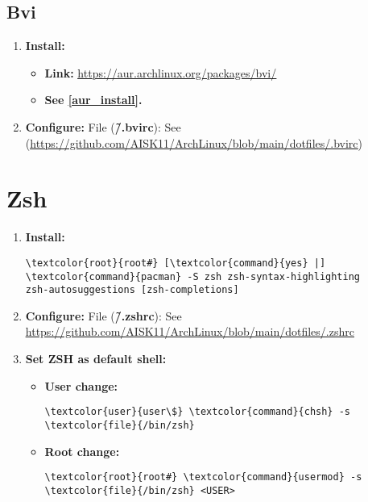 \documentclass[10pt, a4paper, onecolumn, openany]{book} %
\begin{document}
\subsection{Bvi}
\begin{enumerate}
    \item \textbf{Install:}
    \begin{itemize}
        \item \textbf{Link:} \underline{\href{https://aur.archlinux.org/packages/bvi/}{https://aur.archlinux.org/packages/bvi/}}
        \item \textbf{See \underline{\ref{aur_install}}.}
    \end{itemize}
    \item \textbf{Configure:}
\newline File (\textbf{\textcolor{file}{\~/.bvirc}}):
\newline See (\underline{\href{https://github.com/AISK11/ArchLinux/blob/main/dotfiles/.bvirc}{https://github.com/AISK11/ArchLinux/blob/main/dotfiles/.bvirc}})
\end{enumerate}
\section{Zsh}
\begin{enumerate}
    \item \textbf{Install:}
\begin{Verbatim}[commandchars=\\\{\}]
\textcolor{root}{root#} [\textcolor{command}{yes} |] \textcolor{command}{pacman} -S zsh zsh-syntax-highlighting
zsh-autosuggestions [zsh-completions]
\end{Verbatim}    
    \item \textbf{Configure:}
\newline File (\textbf{\textcolor{file}{\~/.zshrc}}):
\newline See \underline{\href{https://github.com/AISK11/ArchLinux/blob/main/dotfiles/.zshrc}{https://github.com/AISK11/ArchLinux/blob/main/dotfiles/.zshrc}}
    \item \textbf{Set ZSH as default shell:}
    \begin{itemize}
        \item \textbf{User change:}
\begin{Verbatim}[commandchars=\\\{\}]
\textcolor{user}{user\$} \textcolor{command}{chsh} -s \textcolor{file}{/bin/zsh}
\end{Verbatim}
        \item \textbf{Root change:}
\begin{Verbatim}[commandchars=\\\{\}]
\textcolor{root}{root#} \textcolor{command}{usermod} -s \textcolor{file}{/bin/zsh} <USER>
\end{Verbatim}
    \end{itemize}
\end{enumerate}
\end{document}
